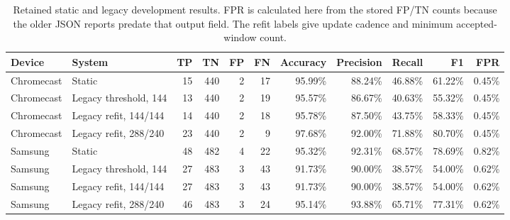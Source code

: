 \begin{table}
\centering\small
\begin{tabular}{llrrrrrrrrr}
\toprule
\textbf{Device} & \textbf{System} & \textbf{TP} & \textbf{TN} & \textbf{FP} & \textbf{FN} & \textbf{Accuracy} & \textbf{Precision} & \textbf{Recall} & \textbf{F1} & \textbf{FPR} \\
\midrule
Chromecast & Static & 15 & 440 & 2 & 17 & 95.99\% & 88.24\% & 46.88\% & 61.22\% & 0.45\% \\
Chromecast & Legacy threshold, 144 & 13 & 440 & 2 & 19 & 95.57\% & 86.67\% & 40.63\% & 55.32\% & 0.45\% \\
Chromecast & Legacy refit, 144/144 & 14 & 440 & 2 & 18 & 95.78\% & 87.50\% & 43.75\% & 58.33\% & 0.45\% \\
Chromecast & Legacy refit, 288/240 & 23 & 440 & 2 & 9 & 97.68\% & 92.00\% & 71.88\% & 80.70\% & 0.45\% \\
\midrule
Samsung & Static & 48 & 482 & 4 & 22 & 95.32\% & 92.31\% & 68.57\% & 78.69\% & 0.82\% \\
Samsung & Legacy threshold, 144 & 27 & 483 & 3 & 43 & 91.73\% & 90.00\% & 38.57\% & 54.00\% & 0.62\% \\
Samsung & Legacy refit, 144/144 & 27 & 483 & 3 & 43 & 91.73\% & 90.00\% & 38.57\% & 54.00\% & 0.62\% \\
Samsung & Legacy refit, 288/240 & 46 & 483 & 3 & 24 & 95.14\% & 93.88\% & 65.71\% & 77.31\% & 0.62\% \\
\bottomrule
\end{tabular}
\caption{Retained static and legacy development results. FPR is calculated here from the stored FP/TN counts because the older JSON reports predate that output field. The refit labels give update cadence and minimum accepted-window count.}
\label{tab:master-results}
\end{table}
